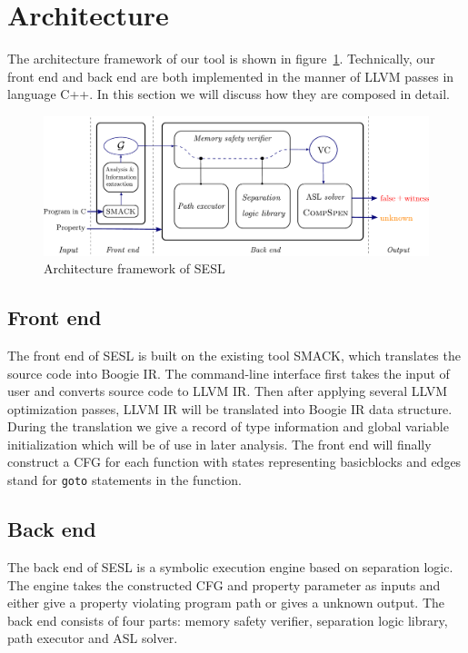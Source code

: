 \documentclass[runningheads]{llncs}
\begin{document}
\section{Architecture}


The architecture framework of our tool is shown in figure~\ref{fig1}. Technically, our front end and back end are both implemented in the manner of LLVM passes in language C++. In this section we will discuss how they are composed in detail.  

\begin{figure}
\includegraphics[width=\textwidth]{svcomp.pdf}
\caption{Architecture framework of \textsc{SESL}} \label{fig1}
\end{figure}

\subsection{Front end} The front end of \textsc{SESL} is built on the existing tool \textsc{SMACK}, which translates the source code into Boogie IR. The command-line interface first takes the input of user and converts source code to LLVM IR. 
Then after applying several LLVM optimization passes, LLVM IR will be translated into Boogie IR data structure.
During the translation we give a record of type information and global variable initialization which will be of use in later analysis. 
The front end will finally construct a CFG for each function with states representing basicblocks and edges stand for \texttt{goto} statements in the function. 



\subsection{Back end}
The back end of \textsc{SESL} is a symbolic execution engine based on separation logic. The engine takes the constructed CFG and property parameter as inputs and either give a property violating program path or gives a unknown output. The back end consists of four parts: memory safety verifier, separation logic library, path executor and ASL solver.
\end{document}
